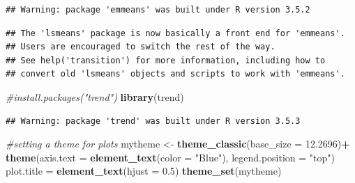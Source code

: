 \documentclass[12pt,]{article}
\newenvironment{Shaded}{\begin{snugshade}}{\end{snugshade}}
\newcommand{\KeywordTok}[1]{\textcolor[rgb]{0.13,0.29,0.53}{\textbf{#1}}}
\newcommand{\DataTypeTok}[1]{\textcolor[rgb]{0.13,0.29,0.53}{#1}}
\newcommand{\FloatTok}[1]{\textcolor[rgb]{0.00,0.00,0.81}{#1}}
\newcommand{\StringTok}[1]{\textcolor[rgb]{0.31,0.60,0.02}{#1}}
\newcommand{\CommentTok}[1]{\textcolor[rgb]{0.56,0.35,0.01}{\textit{#1}}}
\newcommand{\OperatorTok}[1]{\textcolor[rgb]{0.81,0.36,0.00}{\textbf{#1}}}
\newcommand{\NormalTok}[1]{#1}
\begin{document}
\begin{verbatim}
## Warning: package 'emmeans' was built under R version 3.5.2
\end{verbatim}

\begin{verbatim}
## The 'lsmeans' package is now basically a front end for 'emmeans'.
## Users are encouraged to switch the rest of the way.
## See help('transition') for more information, including how to
## convert old 'lsmeans' objects and scripts to work with 'emmeans'.
\end{verbatim}

\begin{Shaded}
\begin{Highlighting}[]
\CommentTok{#install.packages("trend")}
\KeywordTok{library}\NormalTok{(trend)}
\end{Highlighting}
\end{Shaded}

\begin{verbatim}
## Warning: package 'trend' was built under R version 3.5.3
\end{verbatim}

\begin{Shaded}
\begin{Highlighting}[]
\CommentTok{#setting a theme for plots}
\NormalTok{mytheme <-}\StringTok{ }\KeywordTok{theme_classic}\NormalTok{(}\DataTypeTok{base_size =} \FloatTok{12.2696}\NormalTok{)}\OperatorTok{+}
\StringTok{  }\KeywordTok{theme}\NormalTok{(}\DataTypeTok{axis.text =} \KeywordTok{element_text}\NormalTok{(}\DataTypeTok{color =} \StringTok{"Blue"}\NormalTok{),}
  \DataTypeTok{legend.position =} \StringTok{"top"}\NormalTok{)}
\NormalTok{  plot.title =}\StringTok{ }\KeywordTok{element_text}\NormalTok{(}\DataTypeTok{hjust =} \FloatTok{0.5}\NormalTok{)}
\KeywordTok{theme_set}\NormalTok{(mytheme)}
\end{Highlighting}
\end{Shaded}

\begin{Shaded}
\end{Shaded}
\end{document}
